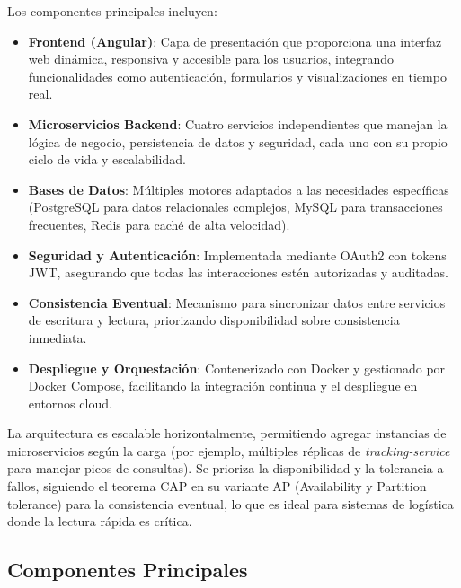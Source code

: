 \documentclass[a4paper,12pt]{article}
\begin{document}
Los componentes principales incluyen:
\begin{itemize}
    \item \textbf{Frontend (Angular)}: Capa de presentación que proporciona una interfaz web dinámica, responsiva y accesible para los usuarios, integrando funcionalidades como autenticación, formularios y visualizaciones en tiempo real.
    \item \textbf{Microservicios Backend}: Cuatro servicios independientes que manejan la lógica de negocio, persistencia de datos y seguridad, cada uno con su propio ciclo de vida y escalabilidad.
    \item \textbf{Bases de Datos}: Múltiples motores adaptados a las necesidades específicas (PostgreSQL para datos relacionales complejos, MySQL para transacciones frecuentes, Redis para caché de alta velocidad).
    \item \textbf{Seguridad y Autenticación}: Implementada mediante OAuth2 con tokens JWT, asegurando que todas las interacciones estén autorizadas y auditadas.
    \item \textbf{Consistencia Eventual}: Mecanismo para sincronizar datos entre servicios de escritura y lectura, priorizando disponibilidad sobre consistencia inmediata.
    \item \textbf{Despliegue y Orquestación}: Contenerizado con Docker y gestionado por Docker Compose, facilitando la integración continua y el despliegue en entornos cloud.
\end{itemize}

La arquitectura es escalable horizontalmente, permitiendo agregar instancias de microservicios según la carga (por ejemplo, múltiples réplicas de \textit{tracking-service} para manejar picos de consultas). Se prioriza la disponibilidad y la tolerancia a fallos, siguiendo el teorema CAP en su variante AP (Availability y Partition tolerance) para la consistencia eventual, lo que es ideal para sistemas de logística donde la lectura rápida es crítica.

\subsection{Componentes Principales}
\end{document}
